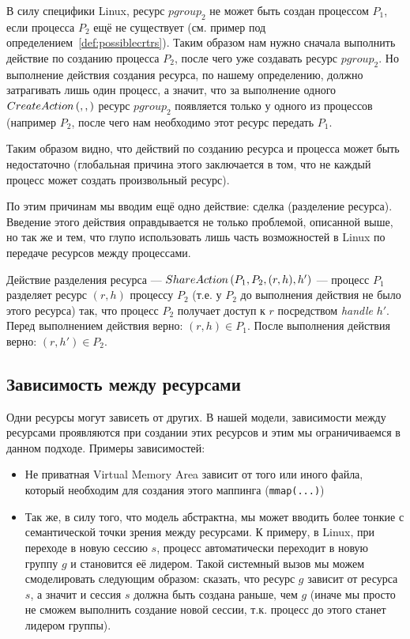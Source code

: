 В силу специфики Linux, ресурс $pgroup_2$ не может быть создан процессом $P_1$, если процесса $P_2$ ещё не существует (см. пример под определением~\ref{def:possiblecrtrs}). Таким образом нам нужно сначала выполнить действие по созданию процесса $P_2$, после чего уже создавать ресурс $pgroup_2$. Но выполнение действия создания ресурса, по нашему определению, должно затрагивать лишь один процесс, а значит, что за выполнение одного $CreateAction\left( , ,  \right)$ ресурс $pgroup_2$ появляется только у одного из процессов (например $P_2$, после чего нам необходимо этот ресурс передать $P_1$.

Таким образом видно, что действий по созданию ресурса и процесса может быть недостаточно (глобальная причина этого заключается в том, что не каждый процесс может создать произвольный ресурс).

По этим причинам мы вводим ещё одно действие: сделка (разделение ресурса). Введение этого действия оправдывается не только проблемой, описанной выше, но так же и тем, что глупо использовать лишь часть возможностей в Linux по передаче ресурсов между процессами.

\begin{defn}
\label{def:shareact}
Действие разделения ресурса --- $ShareAction\left( P_1, P_2, (r, h), h' \right)$ --- процесс $P_1$ разделяет ресурс $(r, h)$ процессу $P_2$ (т.е. у $P_2$ до выполнения действия не было этого ресурса) так, что процесс $P_2$ получает доступ к $r$ посредством \textit{handle} $h'$. Перед выполнением действия верно: $(r, h) \in P_1$. После выполнения действия верно: $(r, h') \in P_2$.
\end{defn}

\subsection{Зависимость между ресурсами}
\label{chap2:subsec:dependencies}

Одни ресурсы могут зависеть от других. В нашей модели, зависимости между ресурсами проявляются при создании этих ресурсов и этим мы ограничиваемся в данном подходе. Примеры зависимостей:

\begin{itemize}
	\item Не приватная Virtual Memory Area зависит от того или иного файла, который необходим для создания этого маппинга (\texttt{mmap(...)})
	\item Так же, в силу того, что модель абстрактна, мы может вводить более тонкие с семантической точки зрения между
	ресурсами. К примеру, в Linux, при переходе в новую сессию $s$, процесс автоматически переходит в новую группу $g$ и становится её лидером. Такой системный вызов мы можем смоделировать следующим образом: сказать, что ресурс $g$ зависит от ресурса $s$, а значит и сессия $s$ должна быть создана раньше, чем $g$ (иначе мы просто не сможем выполнить создание новой сессии, т.к. процесс до этого станет лидером группы).
\end{itemize}

